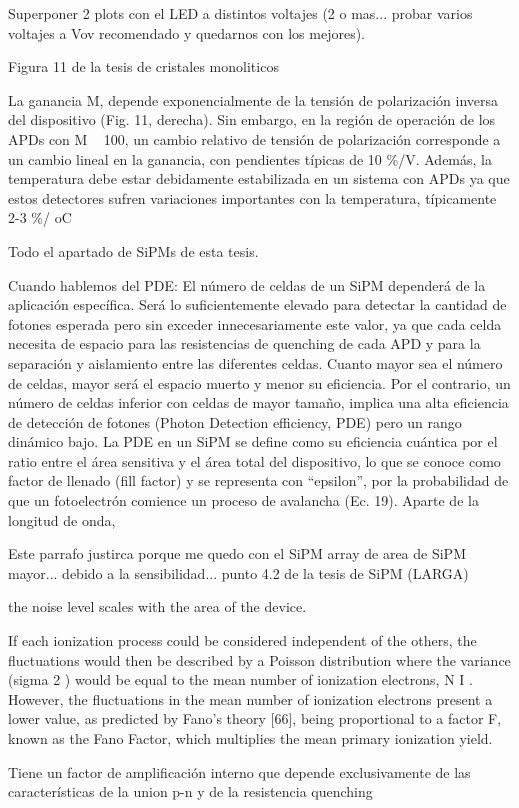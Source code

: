 Superponer 2 plots con el LED a distintos voltajes (2 o mas... probar varios voltajes a Vov recomendado y quedarnos con los mejores).

Figura 11 de la tesis de cristales monoliticos

La ganancia M, depende exponencialmente de la tensión de polarización inversa del dispositivo (Fig. 11, derecha). Sin embargo, en la región de operación de los APDs con M ~ 100, un cambio relativo de tensión de polarización corresponde a un cambio lineal en la ganancia, con pendientes típicas de 10 \%/V. Además, la temperatura debe estar debidamente estabilizada en un sistema con APDs ya que estos detectores sufren variaciones importantes con la temperatura, típicamente ~ 2-3 \%/ oC

Todo el apartado de SiPMs de esta tesis.

Cuando hablemos del PDE:
El número de celdas de un SiPM dependerá de la aplicación específica. Será lo suficientemente elevado para detectar la cantidad de fotones esperada pero sin exceder innecesariamente este valor, ya que cada celda necesita de espacio para las resistencias de quenching de cada APD y para la separación y aislamiento entre las diferentes celdas. Cuanto mayor sea el número de celdas, mayor será el espacio muerto y menor su eficiencia. Por el contrario, un número de celdas inferior con celdas de mayor tamaño, implica una alta eficiencia de detección de fotones (Photon Detection efficiency, PDE) pero un rango dinámico bajo. La PDE en un SiPM se define como su eficiencia cuántica por el ratio entre el área sensitiva y el área total del dispositivo, lo que se conoce como factor de llenado (fill factor) y se representa con “epsilon”, por la probabilidad de que un fotoelectrón comience un proceso de avalancha (Ec. 19). Aparte de la longitud de onda, 

Este parrafo justirca porque me quedo con el SiPM array de area de SiPM mayor... debido a la sensibilidad... punto 4.2 de la tesis de SiPM (LARGA)



the noise level scales with the area of the device. 




If each ionization process could be considered independent of the others, the fluctuations would then be described by a Poisson distribution where the variance (sigma 2 ) would be equal to the mean number of ionization electrons, N I . However, the fluctuations in the mean number of ionization electrons present a lower value, as predicted by Fano’s theory [66], being proportional to a factor F, known as the Fano Factor, which multiplies the mean primary ionization yield. 


Tiene un factor de amplificación interno que depende exclusivamente de las características de la union p-n y de la resistencia quenching